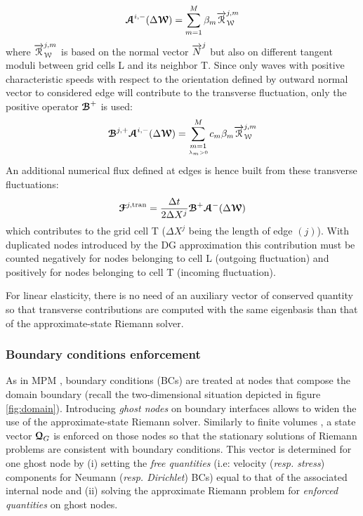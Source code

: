 \begin{equation}
{\boldsymbol{\mathcal{A}}}^{i,-}(\Delta {\boldsymbol{\mathcal{W}}}) = \sum_{m=1}^{M} \beta_m {\overrightarrow{\mathcal{R}}}^{j,m}_{\mathcal{W}}
\end{equation}
where ${\overrightarrow{\mathcal{R}}}_{\mathcal{W}}^{j,m}$ is based on the normal vector ${\overrightarrow{N}}^j$ but also on different tangent moduli between grid cells L and its neighbor T. Since only waves with positive characteristic speeds with respect to the orientation defined by outward normal vector to considered edge will contribute to the transverse fluctuation, only the positive operator ${\boldsymbol{\mathcal{B}}}^+$ is used:
\begin{equation}
{\boldsymbol{\mathcal{B}}}^{j,+} {\boldsymbol{\mathcal{A}}}^{i,-}(\Delta {\boldsymbol{\mathcal{W}}}) = \sum_{\underset{\lambda_m >0}{m=1}}^{M} c_m \beta_m {\overrightarrow{\mathcal{R}}}_{\mathcal{W}}^{j,m}
\end{equation}
An additional numerical flux defined at edges is hence built from these transverse fluctuations:
\begin{equation}
{\boldsymbol{\mathcal{F}}}^{j,\text{tran}} = \frac{\Delta t}{2 \Delta X^j} {\boldsymbol{\mathcal{B}}}^+ {\boldsymbol{\mathcal{A}}}^-(\Delta {\boldsymbol{\mathcal{W}}})
\end{equation}
which contributes to the grid cell T ($\Delta X^j$ being the length of edge $(j)$). With duplicated nodes introduced by the DG approximation this contribution must be counted negatively for nodes belonging to cell L (outgoing fluctuation) and positively for nodes belonging to cell T (incoming fluctuation).

\begin{remark} 
  For linear elasticity, there is no need of an auxiliary vector of conserved quantity so that transverse contributions are computed with the same eigenbasis than that of the approximate-state Riemann solver.
\end{remark}

\subsubsection*{Boundary conditions enforcement}
As in MPM \cite{Love,BC_MPM}, boundary conditions (BCs) are treated at nodes that compose the domain boundary (recall the two-dimensional situation depicted in figure \ref{fig:domain}). Introducing \textit{ghost nodes} on boundary interfaces allows to widen the use of the approximate-state Riemann solver. Similarly to finite volumes \cite{Leveque}, a state vector ${\boldsymbol{\mathcal{Q}}}_G$ is enforced on those nodes so that the stationary solutions of Riemann problems are consistent with boundary conditions. This vector is determined for one ghost node by (i) setting the \textit{free quantities} (i.e: velocity (\textit{resp. stress}) components for Neumann (\textit{resp. Dirichlet}) BCs) equal to that of the associated internal node and (ii) solving the approximate Riemann problem for \textit{enforced quantities} on ghost nodes.

